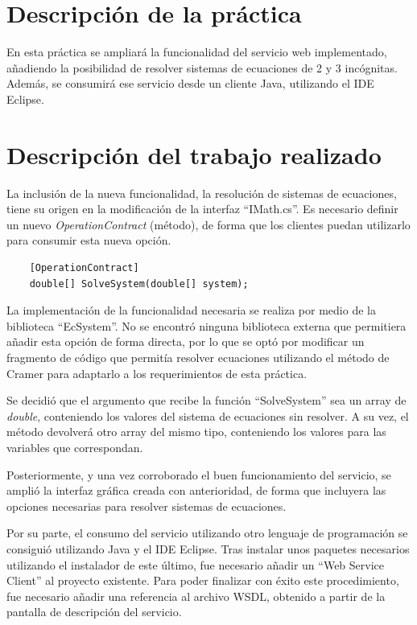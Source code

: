 \documentclass[a4paper,openright,10pt]{article}
\begin{document}
\clearpage

\pagestyle{plain} %


\section {Descripción de la práctica}

En esta práctica se ampliará la funcionalidad del servicio web implementado, añadiendo la posibilidad de resolver sistemas de ecuaciones de 2 y 3 incógnitas. Además, se consumirá ese servicio desde un cliente Java, utilizando el IDE Eclipse.

\section{Descripción del trabajo realizado}

La inclusión de la nueva funcionalidad, la resolución de sistemas de ecuaciones, tiene su origen en la modificación de la interfaz ``IMath.cs''. Es necesario definir un nuevo \textit{OperationContract} (método), de forma que los clientes puedan utilizarlo para consumir esta nueva opción.

\begin{verbatim}
	[OperationContract]
	double[] SolveSystem(double[] system);
\end{verbatim}

La implementación de la funcionalidad necesaria se realiza por medio de la biblioteca ``EcSystem''. No se encontró ninguna biblioteca externa que permitiera añadir esta opción de forma directa, por lo que se optó por modificar un fragmento de código que permitía resolver ecuaciones utilizando el método de Cramer para adaptarlo a los requerimientos de esta práctica.

Se decidió que el argumento que recibe la función ``SolveSystem'' sea un array de \textit{double}, conteniendo los valores del sistema de ecuaciones sin resolver. A su vez, el método devolverá otro array del mismo tipo, conteniendo los valores para las variables que correspondan.

Posteriormente, y una vez corroborado el buen funcionamiento del servicio, se amplió la interfaz gráfica creada con anterioridad, de forma que incluyera las opciones necesarias para resolver sistemas de ecuaciones.

Por su parte, el consumo del servicio utilizando otro lenguaje de programación se consiguió utilizando Java y el IDE Eclipse. Tras instalar unos paquetes necesarios utilizando el instalador de este último, fue necesario añadir un ``Web Service Client'' al proyecto existente. Para poder finalizar con éxito este procedimiento, fue necesario añadir una referencia al archivo WSDL, obtenido a partir de la pantalla de descripción del servicio.
\end{document}
